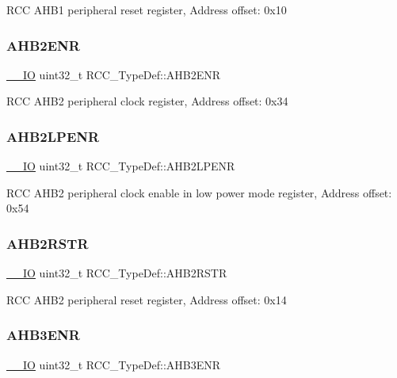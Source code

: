 R\+CC A\+H\+B1 peripheral reset register, Address offset\+: 0x10 \mbox{\label{struct_r_c_c___type_def_af326cb98c318fc08894a8dd79c2c675f}} 
\subsubsection{\texorpdfstring{AHB2ENR}{AHB2ENR}}
{\footnotesize\ttfamily \mbox{\hyperlink{core__sc300_8h_aec43007d9998a0a0e01faede4133d6be}{\+\_\+\+\_\+\+IO}} uint32\+\_\+t R\+C\+C\+\_\+\+Type\+Def\+::\+A\+H\+B2\+E\+NR}

R\+CC A\+H\+B2 peripheral clock register, Address offset\+: 0x34 \mbox{\label{struct_r_c_c___type_def_a1de344446cba3f4dd15c56fbe20eb0dd}} 
\subsubsection{\texorpdfstring{AHB2LPENR}{AHB2LPENR}}
{\footnotesize\ttfamily \mbox{\hyperlink{core__sc300_8h_aec43007d9998a0a0e01faede4133d6be}{\+\_\+\+\_\+\+IO}} uint32\+\_\+t R\+C\+C\+\_\+\+Type\+Def\+::\+A\+H\+B2\+L\+P\+E\+NR}

R\+CC A\+H\+B2 peripheral clock enable in low power mode register, Address offset\+: 0x54 \mbox{\label{struct_r_c_c___type_def_a343e0230ded55920ff2a04fbde0e5bcd}} 
\subsubsection{\texorpdfstring{AHB2RSTR}{AHB2RSTR}}
{\footnotesize\ttfamily \mbox{\hyperlink{core__sc300_8h_aec43007d9998a0a0e01faede4133d6be}{\+\_\+\+\_\+\+IO}} uint32\+\_\+t R\+C\+C\+\_\+\+Type\+Def\+::\+A\+H\+B2\+R\+S\+TR}

R\+CC A\+H\+B2 peripheral reset register, Address offset\+: 0x14 \mbox{\label{struct_r_c_c___type_def_ad4ea7be562b42e2ae1a84db44121195d}} 
\subsubsection{\texorpdfstring{AHB3ENR}{AHB3ENR}}
{\footnotesize\ttfamily \mbox{\hyperlink{core__sc300_8h_aec43007d9998a0a0e01faede4133d6be}{\+\_\+\+\_\+\+IO}} uint32\+\_\+t R\+C\+C\+\_\+\+Type\+Def\+::\+A\+H\+B3\+E\+NR}

